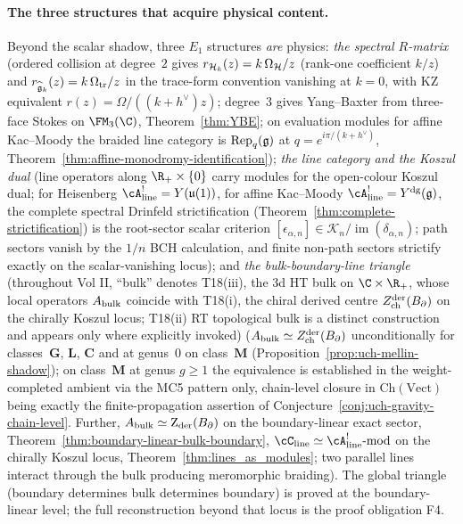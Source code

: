 \paragraph{The three structures that acquire physical content.}
Beyond the scalar shadow, three $E_1$ structures \emph{are}
physics:
\emph{the spectral $R$-matrix} (ordered collision at degree~$2$
gives $r_{\mathcal{H}_k}(z)=k\,\Omega_{\mathcal{H}}/z$ (rank-one coefficient $k/z$) and
$r_{\widehat{\mathfrak{g}}_k}(z) = k\,\Omega_{\mathrm{tr}}/z$ in the trace-form
convention vanishing at $k = 0$, with KZ equivalent
$r(z) = \Omega/((k+h^\vee)z)$; degree~$3$ gives Yang--Baxter
from three-face Stokes on $\FM_3(\C)$,
Theorem~\ref{thm:YBE}; on evaluation modules for affine
Kac--Moody the braided line category is
$\operatorname{Rep}_q(\mathfrak{g})$ at $q = e^{i\pi/(k+h^\vee)}$,
Theorem~\ref{thm:affine-monodromy-identification});
\emph{the line category and the Koszul dual} (line operators
along $\R_+ \times \{0\}$ carry modules for the open-colour
Koszul dual; for Heisenberg
$\cA^!_{\mathrm{line}} = Y(\mathfrak{u}(1))$, for affine
Kac--Moody $\cA^!_{\mathrm{line}} = \Ydg(\fg)$, the complete
spectral Drinfeld strictification
(Theorem~\ref{thm:complete-strictification}) is the
root-sector scalar criterion
$[\epsilon_{\alpha,n}]\in
\mathscr K_n/\operatorname{im}(\delta_{\alpha,n})$; path sectors
vanish by the $1/n$ BCH calculation, and finite non-path sectors
strictify exactly on the scalar-vanishing locus); and
\emph{the bulk-boundary-line triangle}
(throughout Vol II, ``bulk'' denotes T18(iii), the 3d HT bulk on
$\C\times\R_+$, whose local operators $A_{\mathrm{bulk}}$ coincide with T18(i),
the chiral derived centre $Z^{\mathrm{der}}_{\mathrm{ch}}(B_{\partial})$
on the chirally Koszul locus; T18(ii) RT topological bulk is a
distinct construction and appears only where explicitly invoked)
\smallskip
($A_{\mathrm{bulk}} \simeq Z^{\mathrm{der}}_{\mathrm{ch}}(B_{\partial})$
unconditionally for classes~$\mathbf{G}$, $\mathbf{L}$,
$\mathbf{C}$ and at genus~$0$ on class~$\mathbf{M}$
(Proposition~\ref{prop:uch-mellin-shadow}); on class~$\mathbf{M}$
at genus $g \geq 1$ the equivalence is established in the
weight-completed ambient via the MC5 pattern only, chain-level
closure in $\mathrm{Ch}(\mathrm{Vect})$ being exactly the
finite-propagation assertion of
Conjecture~\ref{conj:uch-gravity-chain-level}.
Further, $A_{\mathrm{bulk}} \simeq \operatorname{Z}_{\mathrm{der}}(B_{\partial})$ on the
boundary-linear exact sector,
Theorem~\ref{thm:boundary-linear-bulk-boundary},
$\cC_{\mathrm{line}} \simeq \cA^!_{\mathrm{line}}\text{-mod}$ on
the chirally Koszul locus,
Theorem~\ref{thm:lines_as_modules}; two parallel lines interact
through the bulk producing meromorphic braiding).
The global triangle (boundary determines bulk determines
boundary) is proved at the boundary-linear level; the full
reconstruction beyond that locus is the proof obligation F4.

